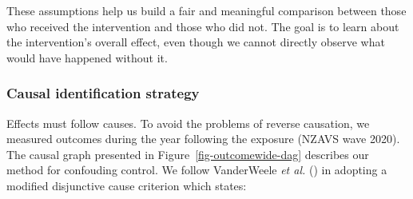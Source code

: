 \documentclass[
  singlecolumn,
  9pt]{article}
\begin{document}
These assumptions help us build a fair and meaningful comparison between
those who received the intervention and those who did not. The goal is
to learn about the intervention's overall effect, even though we cannot
directly observe what would have happened without it.

\subsubsection{Causal identification
strategy}\label{causal-identification-strategy}

Effects must follow causes. To avoid the problems of reverse causation,
we measured outcomes during the year following the exposure (NZAVS wave
2020). The causal graph presented in Figure~\ref{fig-outcomewide-dag}
describes our method for confouding control. We follow VanderWeele
\emph{et al.} () in adopting a
modified disjunctive cause criterion which states:
\end{document}
